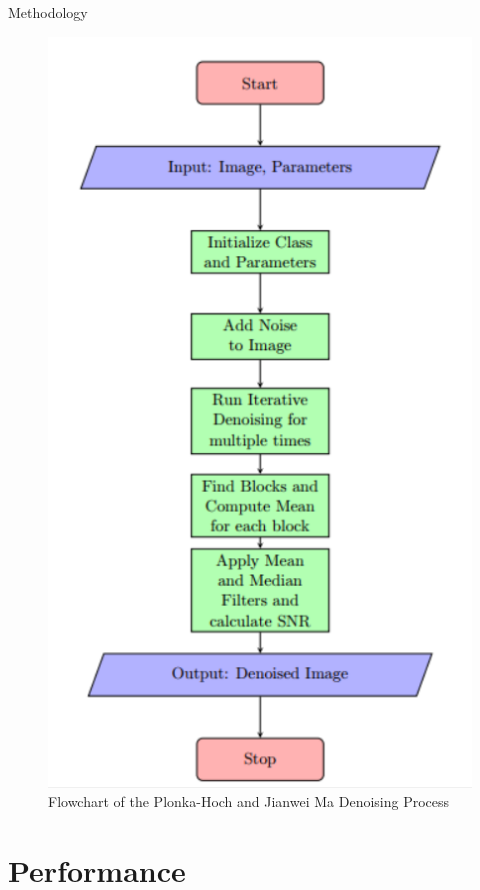 \documentclass{beamer}
\begin{document}
\begin{frame}[plain]
\begin{block}{Methodology}
    
\end{block}
\begin{figure}
    \centering
    \includegraphics[scale = 0.35]{img/method.png}
    \caption{Flowchart of the Plonka-Hoch and Jianwei Ma Denoising Process}
    \label{fig:fig demo}
\end{figure}


\end{frame}
\section{Performance}
\end{document}
